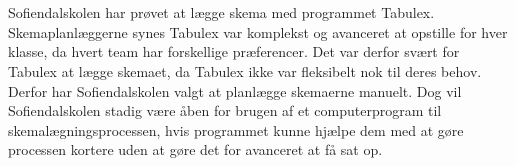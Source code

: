 \\\\
Sofiendalskolen har prøvet at lægge skema med programmet Tabulex. Skemaplanlæggerne synes Tabulex var komplekst og avanceret at opstille for hver klasse, da hvert team har forskellige præferencer. Det var derfor svært for Tabulex at lægge skemaet, da Tabulex ikke var fleksibelt nok til deres behov. Derfor har Sofiendalskolen valgt at planlægge skemaerne manuelt. Dog vil Sofiendalskolen stadig være åben for brugen af et computerprogram til skemalægningsprocessen, hvis programmet kunne hjælpe dem med at gøre processen kortere uden at gøre det for avanceret at få sat op.

